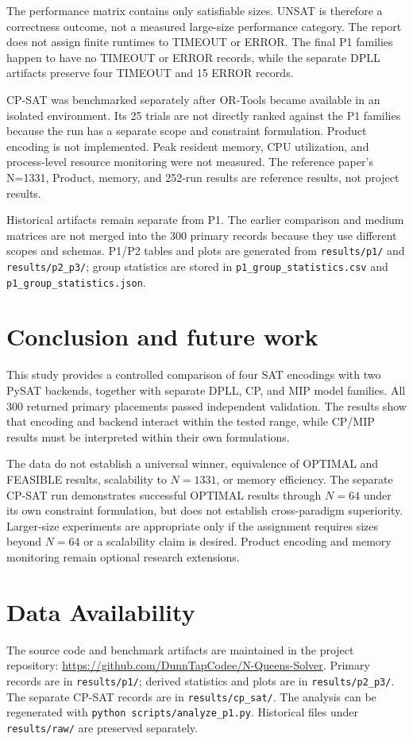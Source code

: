 \documentclass[a4paper,fleqn]{cas-sc}
\begin{document}
The performance matrix contains only satisfiable sizes. UNSAT is therefore a
correctness outcome, not a measured large-size performance category. The report
does not assign finite runtimes to TIMEOUT or ERROR. The final P1 families
happen to have no TIMEOUT or ERROR records, while the separate DPLL artifacts
preserve four TIMEOUT and 15 ERROR records.

CP-SAT was benchmarked separately after OR-Tools became available in an
isolated environment. Its 25 trials are not directly ranked against the P1
families because the run has a separate scope and constraint formulation.
Product encoding is not implemented. Peak resident memory, CPU utilization,
and process-level resource monitoring were not measured. The reference paper's
N=1331, Product, memory, and 252-run results are reference results, not project
results.

Historical artifacts remain separate from P1. The earlier comparison and
medium matrices are not merged into the 300 primary records because they use
different scopes and schemas. P1/P2 tables and plots are generated from
\texttt{results/p1/} and \texttt{results/p2\_p3/}; group statistics are stored
in \texttt{p1\_group\_statistics.csv} and \texttt{p1\_group\_statistics.json}.

\section{Conclusion and future work}
This study provides a controlled comparison of four SAT encodings with two
PySAT backends, together with separate DPLL, CP, and MIP model families. All
300 returned primary placements passed independent validation. The results
show that encoding and backend interact within the tested range, while CP/MIP
results must be interpreted within their own formulations.

The data do not establish a universal winner, equivalence of OPTIMAL and
FEASIBLE results, scalability to $N=1331$, or memory efficiency. The separate
CP-SAT run demonstrates successful OPTIMAL results through $N=64$ under its
own constraint formulation, but does not establish cross-paradigm superiority.
Larger-size experiments are appropriate only if the assignment requires sizes
beyond $N=64$ or a scalability claim is desired. Product encoding and memory
monitoring remain optional research extensions.

\section*{Data Availability}
The source code and benchmark artifacts are maintained in the project
repository: \url{https://github.com/DunnTapCodee/N-Queens-Solver}. Primary
records are in \texttt{results/p1/}; derived statistics and plots are in
\texttt{results/p2\_p3/}. The separate CP-SAT records are in
\texttt{results/cp\_sat/}. The analysis can be regenerated with
\texttt{python scripts/analyze\_p1.py}. Historical files under
\texttt{results/raw/} are preserved separately.
\end{document}
